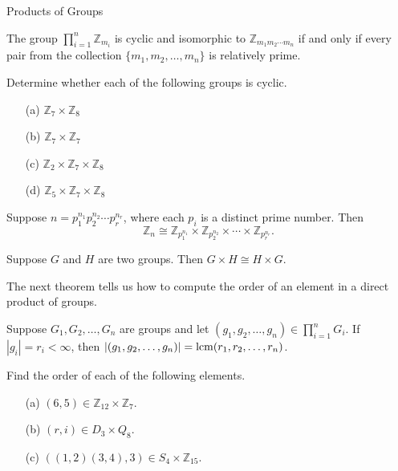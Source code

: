 \begin{section}{Products of Groups}
\begin{theorem}
The group $\prod_{i=1}^n \mathbb{Z}_{m_i}$ is cyclic and isomorphic to $\mathbb{Z}_{m_1m_2\cdots m_n}$ if and only if every pair from the collection $\{m_1,m_2,\ldots, m_n\}$ is relatively prime.
\end{theorem}

\begin{exercise}
Determine whether each of the following groups is cyclic.
\begin{enumerate}
\item[(a)] $\mathbb{Z}_7\times \mathbb{Z}_8$
\item[(b)] $\mathbb{Z}_7\times \mathbb{Z}_7$
\item[(c)] $\mathbb{Z}_2\times \mathbb{Z}_7\times \mathbb{Z}_8$
\item[(d)] $\mathbb{Z}_5\times \mathbb{Z}_7\times \mathbb{Z}_8$
\end{enumerate}
\end{exercise}

\begin{theorem}
Suppose $n=p_1^{n_1}p_2^{n_2}\cdots p_r^{n_r}$, where each $p_i$ is a distinct prime number.  Then
\[
\mathbb{Z}_n\cong \mathbb{Z}_{p_1^{n_1}}\times \mathbb{Z}_{p_2^{n_2}}\times \cdots \times \mathbb{Z}_{p_r^{n_r}}.
\]
\end{theorem}

\begin{theorem}
Suppose $G$ and $H$ are two groups.  Then $G\times H\cong H\times G$.
\end{theorem}

The next theorem tells us how to compute the order of an element in a direct product of groups.

\begin{theorem}
Suppose $G_1, G_2,\ldots, G_n$ are groups and let $(g_1,g_2,\ldots, g_n)\in \prod_{i=1}^nG_i$.  If $|g_i|=r_i<\infty$, then $|(g_1,g_2,\ldots, g_n)|=\operatorname{lcm}(r_1,r_2,\ldots,r_n)$.
\end{theorem}

\begin{exercise}
Find the order of each of the following elements.
\begin{enumerate}
\item[(a)] $(6,5)\in\mathbb{Z}_{12}\times \mathbb{Z}_7$.
\item[(b)] $(r,i)\in D_3\times Q_8$.
\item[(c)] $((1,2)(3,4),3)\in S_4\times \mathbb{Z}_{15}$.
\end{enumerate}
\end{exercise}


\end{section}
